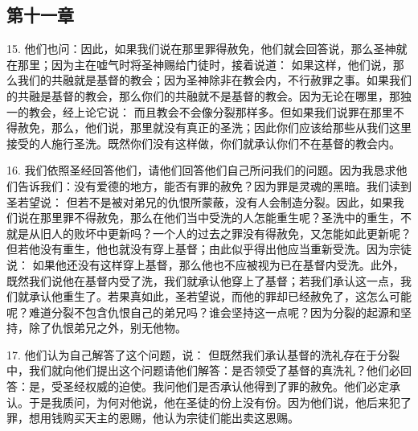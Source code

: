 \subsection{第十一章}

15. 他们也问：因此，如果我们说在那里罪得赦免，他们就会回答说，那么圣神就在那里；因为主在嘘气时将圣神赐给门徒时，接着说道：  如果这样，他们说，那么我们的共融就是基督的教会；因为圣神除非在教会内，不行赦罪之事。如果我们的共融是基督的教会，那么你们的共融就不是基督的教会。因为无论在哪里，那独一的教会，经上论它说： 而且教会不会像分裂那样多。但如果我们说罪在那里不得赦免，那么，他们说，那里就没有真正的圣洗；因此你们应该给那些从我们这里接受的人施行圣洗。既然你们没有这样做，你们就承认你们不在基督的教会内。\par

16. 我们依照圣经回答他们，请他们回答他们自己所问我们的问题。因为我恳求他们告诉我们：没有爱德的地方，能否有罪的赦免？因为罪是灵魂的黑暗。我们读到圣若望说：  但若不是被对弟兄的仇恨所蒙蔽，没有人会制造分裂。因此，如果我们说在那里罪不得赦免，那么在他们当中受洗的人怎能重生呢？圣洗中的重生，不就是从旧人的败坏中更新吗？一个人的过去之罪没有得赦免，又怎能如此更新呢？但若他没有重生，他也就没有穿上基督；由此似乎得出他应当重新受洗。因为宗徒说：  如果他还没有这样穿上基督，那么他也不应被视为已在基督内受洗。此外，既然我们说他在基督内受了洗，我们就承认他穿上了基督；若我们承认这一点，我们就承认他重生了。若果真如此，圣若望说，而他的罪却已经赦免了，这怎么可能呢？难道分裂不包含仇恨自己的弟兄吗？谁会坚持这一点呢？因为分裂的起源和坚持，除了仇恨弟兄之外，别无他物。\par

17. 他们认为自己解答了这个问题，说： 但既然我们承认基督的洗礼存在于分裂中，我们就向他们提出这个问题请他们解答：是否领受了基督的真洗礼？他们必回答：是，受圣经权威的迫使。我问他们是否承认他得到了罪的赦免。他们必定承认。于是我质问，为何对他说，他在圣徒的份上没有份。因为他们说，他后来犯了罪，想用钱购买天主的恩赐，他认为宗徒们能出卖这恩赐。\par

